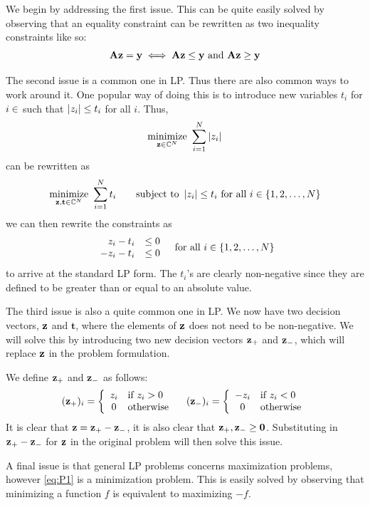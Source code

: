 We begin by addressing the first issue. This can be quite easily solved by observing that an equality constraint can be rewritten as two inequality constraints like so:
\[
	\mathbf{A}\mathbf{z} = \mathbf{y} \iff \mathbf{A}\mathbf{z} \leq \mathbf{y} \text{ and } \mathbf{A}\mathbf{z} \geq \mathbf{y}
\]

The second issue is a common one in LP. Thus there are also common ways to work around it. One popular way of doing this is to introduce new variables $ t_{i} $ for $ i \in \index{N} $ such that $ \left|z_{i}\right| \leq t_{i} $ for all $ i $. Thus, 
\[ 
	\underset{\mathbf{z}\in\mathbb{C}^{N}}{\text{minimize}}~ \sum_{i=1}^{N} \left|z_{i}\right|
\]
can be rewritten as
\[ 
	\underset{\mathbf{z},\mathbf{t} \in \mathbb{C}^{N}}{\text{minimize}}~ \sum_{i=1}^{N}t_{i} \quad \quad\text{subject to}~ \left|z_{i}\right| \leq t_{i} \text{ for all } i \in \{1, 2, \ldots, N\}
\]
we can then rewrite the constraints as
\[
	\begin{array}{r l}
		z_{i} - t_{i} & \leq 0\\
		- z_{i} - t_{i} & \leq 0
	\end{array}
	\quad\text{for all } i \in \{1, 2, \ldots, N\}
\]
to arrive at the standard LP form. The $ t_{i} $'s are clearly non-negative since they are defined to be greater than or equal to an absolute value. 

The third issue is also a quite common one in LP. We now have two decision vectors, $ \mathbf{z}  $ and $ \mathbf{t} $, where the elements of $ \mathbf{z} $ does not need to be non-negative. We will solve this by introducing two new decision vectors $ \mathbf{z}_{+} $ and $ \mathbf{z}_{-} $, which will replace $ \mathbf{z} $ in the problem formulation. 

We define $ \mathbf{z}_{+} $ and $ \mathbf{z}_{-} $ as follows:
\[ 
	(\mathbf{z}_{+})_{i} = \left\{ \begin{array}{cl} z_{i} & \text{if } z_{i} > 0 \\ 0 & \text{otherwise} \end{array} \right.
	\quad
	(\mathbf{z}_{-})_{i} = \left\{ \begin{array}{cl} -z_{i} & \text{if } z_{i} < 0 \\ 0 & \text{otherwise} \end{array} \right.
\]
It is clear that $ \mathbf{z} = \mathbf{z}_{+} - \mathbf{z}_{-} $, it is also clear that $ \mathbf{z}_{+}, \mathbf{z}_{-} \geq \mathbf{0} $. Substituting in $ \mathbf{z}_{+} - \mathbf{z}_{-} $ for $ \mathbf{z} $ in the original problem will then solve this issue. 

A final issue is that general LP problems concerns maximization problems, however \eqref{eq:P1} is a minimization problem. This is easily solved by observing that minimizing a function $ f $ is equivalent to maximizing $ -f $.

